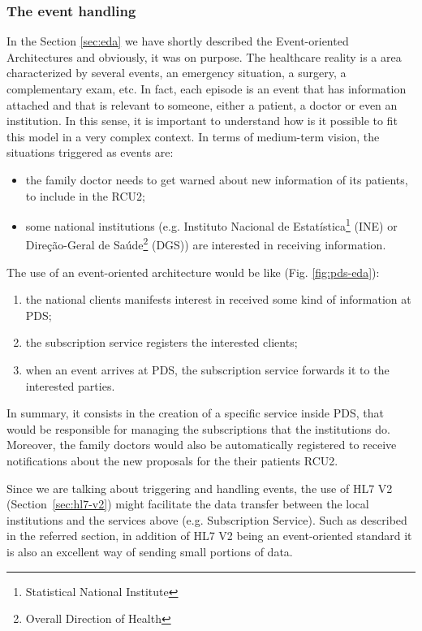 \subsubsection{The event handling}

In the Section \ref{sec:eda} we have shortly described the Event-oriented Architectures and obviously, it was on purpose. The healthcare reality is a area characterized by several events, an emergency situation, a surgery, a complementary exam, etc. In fact, each episode is an event that has information attached and that is relevant to someone, either a patient, a doctor or even an institution. In this sense, it is important to understand how is it possible to fit this model in a very complex context. In terms of medium-term vision, the situations triggered as events are:
\begin{itemize}
\item the family doctor needs to get warned about new information of its patients, to include in the RCU2;
\item some national institutions (e.g. Instituto Nacional de Estatística\footnote{Statistical National Institute} (INE) or Direção-Geral de Saúde\footnote{Overall Direction of Health} (DGS)) are interested in receiving information.
\end{itemize}


The use of an event-oriented architecture would be like (Fig. \ref{fig:pds-eda}):
\begin{enumerate}
\item the national clients manifests interest in received some kind of information at PDS;
\item the subscription service registers the interested clients;
\item when an event arrives at PDS, the subscription service forwards it to the interested parties.
\end{enumerate}

In summary, it consists in the creation of a specific service inside PDS, that would be responsible for managing the subscriptions that the institutions do. Moreover, the family doctors would also be automatically registered to receive notifications about the new proposals for the their patients RCU2.

Since we are talking about triggering and handling events, the use of HL7 V2 (Section~\ref{sec:hl7-v2}) might facilitate the data transfer between the local institutions and the services above (e.g. Subscription Service). Such as described in the referred section, in addition of HL7 V2 being an event-oriented standard it is also an excellent way of sending small portions of data.


